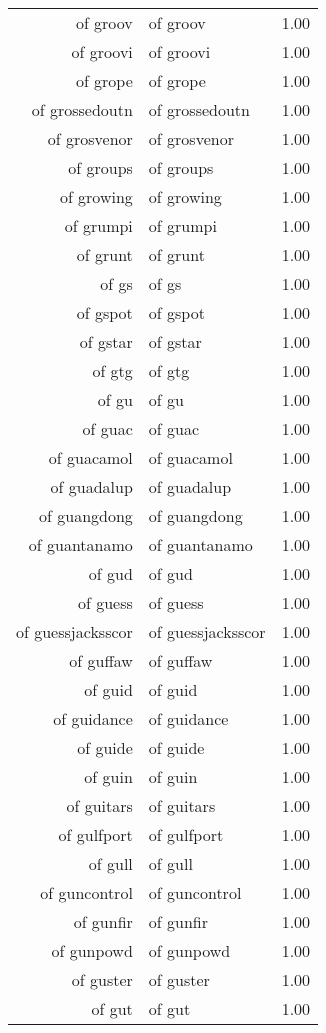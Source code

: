 \begin{table}[ht]
\begin{tabular}{rlr}
  of groov & of groov & 1.00 \\ 
  of groovi & of groovi & 1.00 \\ 
  of grope & of grope & 1.00 \\ 
  of grossedoutn & of grossedoutn & 1.00 \\ 
  of grosvenor & of grosvenor & 1.00 \\ 
  of groups & of groups & 1.00 \\ 
  of growing & of growing & 1.00 \\ 
  of grumpi & of grumpi & 1.00 \\ 
  of grunt & of grunt & 1.00 \\ 
  of gs & of gs & 1.00 \\ 
  of gspot & of gspot & 1.00 \\ 
  of gstar & of gstar & 1.00 \\ 
  of gtg & of gtg & 1.00 \\ 
  of gu & of gu & 1.00 \\ 
  of guac & of guac & 1.00 \\ 
  of guacamol & of guacamol & 1.00 \\ 
  of guadalup & of guadalup & 1.00 \\ 
  of guangdong & of guangdong & 1.00 \\ 
  of guantanamo & of guantanamo & 1.00 \\ 
  of gud & of gud & 1.00 \\ 
  of guess & of guess & 1.00 \\ 
  of guessjacksscor & of guessjacksscor & 1.00 \\ 
  of guffaw & of guffaw & 1.00 \\ 
  of guid & of guid & 1.00 \\ 
  of guidance & of guidance & 1.00 \\ 
  of guide & of guide & 1.00 \\ 
  of guin & of guin & 1.00 \\ 
  of guitars & of guitars & 1.00 \\ 
  of gulfport & of gulfport & 1.00 \\ 
  of gull & of gull & 1.00 \\ 
  of guncontrol & of guncontrol & 1.00 \\ 
  of gunfir & of gunfir & 1.00 \\ 
  of gunpowd & of gunpowd & 1.00 \\ 
  of guster & of guster & 1.00 \\ 
  of gut & of gut & 1.00 \\ 

\end{tabular}
\end{table}
